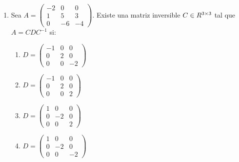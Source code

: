 \documentclass[../practica.root.tex]{subfiles}
\begin{document}
\begin{enumerate}
    \item Sea $A = \begin{pmatrix}
                  -2 & 0 & 0 \\ 1 & 5 & 3 \\ 0 & -6 & -4
              \end{pmatrix}$. Existe una matriz inversible $C \in R^{3\times3}$ tal que $A = CDC^{-1}$ si:
          \begin{enumerate}
              \item $ D = \begin{pmatrix}
                      -1 & 0 & 0  \\
                      0  & 2 & 0  \\
                      0  & 0 & -2
                  \end{pmatrix} $
              \item $ D = \begin{pmatrix}
                      -1 & 0 & 0 \\
                      0  & 2 & 0 \\
                      0  & 0 & 2
                  \end{pmatrix} $
              \item $ D = \begin{pmatrix}
                      1 & 0  & 0 \\
                      0 & -2 & 0 \\
                      0 & 0  & 2
                  \end{pmatrix} $
              \item $ D = \begin{pmatrix}
                      1 & 0  & 0  \\
                      0 & -2 & 0  \\
                      0 & 0  & -2
                  \end{pmatrix} $
          \end{enumerate}
\end{enumerate}
\end{document}
